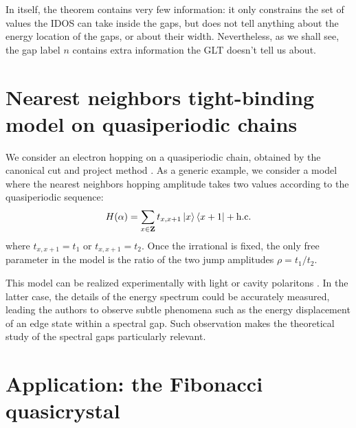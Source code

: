 \documentclass[a4paper]{jpconf}
\begin{document}
In itself, the theorem contains very few information: it only constrains the set of values the IDOS can take inside the gaps, but does not tell anything about the energy location of the gaps, or about their width.
Nevertheless, as we shall see, the gap label $n$ contains extra information the GLT doesn't tell us about.


\section{Nearest neighbors tight-binding model on quasiperiodic chains}

We consider an electron hopping on a quasiperiodic chain, obtained by the canonical cut and project method \cite{baakegrimm}.
As a generic example, we consider a model where the nearest neighbors hopping amplitude takes two values according to the quasiperiodic sequence:
\begin{equation}
	H(\alpha) = \sum_{x \in \mathbf{Z}} t_{x,x+1} \ket{x} \bra{x+1} + \text{h.c.}
\end{equation}
where $t_{x,x+1} = t_1$ or $t_{x,x+1} = t_2$.
Once the irrational is fixed, the only free parameter in the model is the ratio of the two jump amplitudes $\rho = t_1 / t_2$.

This model can be realized experimentally with light \cite{light} or cavity polaritons \cite{polaritons}.
In the latter case, the details of the energy spectrum could be accurately measured, leading the authors to observe subtle phenomena such as the energy displacement of an edge state within a spectral gap.
Such observation makes the theoretical study of the spectral gaps particularly relevant.

\section{Application: the Fibonacci quasicrystal}
\end{document}
